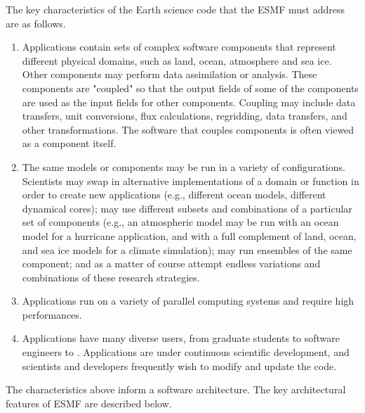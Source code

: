 The key characteristics of the Earth science code that the ESMF must address are as follows.
\begin{enumerate}

\item Applications contain sets of complex software components that represent different 
physical domains, such as land, ocean, atmosphere and sea ice.  Other components may perform data assimilation 
or analysis.  These components are "coupled" so that the output fields of some of the components are used 
as the input fields for other components.  Coupling may include data transfers, unit conversions, flux 
calculations, regridding, data transfers, and other transformations.  The software that couples 
components is often viewed as a component itself.  

\item The same models or components may be run in a variety of configurations.  Scientists may swap in
alternative implementations of a domain or function in order to create new applications (e.g., different 
ocean models, different dynamical cores); may use different subsets and combinations of a particular set of 
components (e.g., an atmospheric model may be run with an ocean model for a hurricane application, and 
with a full complement of land, ocean, and sea ice models for a climate simulation); may run ensembles of the same component; and as a matter of course attempt endless variations and combinations of these research strategies.

\item Applications run on a variety of parallel computing systems and require high performances. 

\item Applications have many diverse users, from graduate students to software engineers to .  Applications are under continuous 
scientific development, and scientists and developers frequently wish to modify and update the code.

\end{enumerate}

The characteristics above inform a software architecture.  The key architectural features of ESMF are described below.

